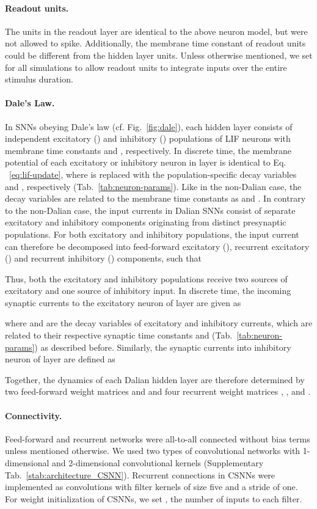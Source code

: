 \documentclass[11pt,a4paper]{article}
\begin{document}
\paragraph{Readout units.} 
The units in the readout layer are identical to the above neuron model, but were not allowed to spike. 
Additionally, the membrane time constant of readout units  could be different from the hidden layer units. 
Unless otherwise mentioned, we set  for all simulations to allow readout units to integrate inputs over the entire stimulus duration. 

\paragraph{Dale's Law.}
In \acp{SNN} obeying Dale's law (cf. Fig.~\ref{fig:dale}), each hidden layer consists of independent excitatory () and inhibitory () populations of \ac{LIF} neurons with membrane time constants  and , respectively. 
In discrete time, the membrane potential of each excitatory or inhibitory neuron  in layer  is identical to Eq. ~\eqref{eq:lif-update}, where  is replaced with the population-specific decay variables  and , respectively (Tab.~\ref{tab:neuron-params}).
Like in the non-Dalian case, the decay variables are related to the membrane time constants as  and .
In contrary to the non-Dalian case, the input currents in Dalian \acp{SNN} consist of separate excitatory and inhibitory components originating from distinct presynaptic populations.
For both excitatory and inhibitory populations, the input current can therefore be decomposed into feed-forward excitatory (), recurrent excitatory () and recurrent inhibitory () components, such that

Thus, both the excitatory and inhibitory populations receive two sources of excitatory and one source of inhibitory input. In discrete time, the incoming synaptic currents to the excitatory neuron  of layer  are given as

where  and  are the decay variables of excitatory and inhibitory currents, which are related to their respective synaptic time constants  and  (Tab.~\ref{tab:neuron-params}) as described before. 
Similarly, the synaptic currents into inhibitory neuron  of layer  are defined as

Together, the dynamics of each Dalian hidden layer are therefore determined by two feed-forward weight matrices  and  and four recurrent weight matrices , ,  and .



\paragraph{Connectivity.} 
Feed-forward and recurrent networks were all-to-all connected without bias terms unless mentioned otherwise.  
We used two types of  convolutional networks with 1-dimensional and 2-dimensional convolutional kernels (Supplementary Tab.~\ref{stab:architecture_CSNN}). 
Recurrent connections in \acp{CSNN} were implemented as convolutions with filter kernels of size five and a stride of one. For weight initialization of \acp{CSNN}, we set , the number of inputs to each filter. 
\end{document}
